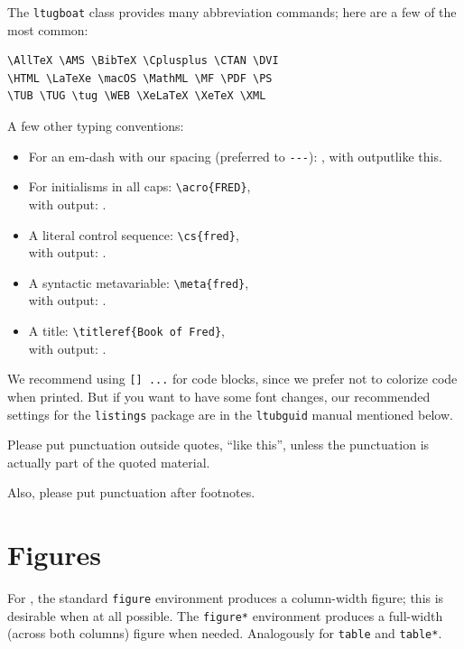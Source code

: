 \documentclass{ltugboat}
\begin{document}
The \texttt{ltugboat} class provides many abbreviation commands; here
are a few of the most common:

\begin{verbatim}
\AllTeX \AMS \BibTeX \Cplusplus \CTAN \DVI
\HTML \LaTeXe \macOS \MathML \MF \PDF \PS
\TUB \TUG \tug \WEB \XeLaTeX \XeTeX \XML
\end{verbatim}

A few other typing conventions:

\begin{itemize}
\item For an em-dash with our spacing (preferred to \verb|---|):
, with output\Dash like this.

\item For initialisms in all caps:
\verb|\acro{FRED}|,\\ with output: .

\item A literal control sequence:
\verb|\cs{fred}|,\\ with output: .

\item A syntactic metavariable:
\verb|\meta{fred}|,\\ with output: .

\item A title:
\verb|\titleref{Book of Fred}|,\\ with output: .
\end{itemize}

We recommend using \texttt{[] ...}
 for code blocks, since we prefer not to
colorize code when printed. But if you want to have some font changes,
our recommended settings for the \texttt{listings} package are in the
\texttt{ltubguid} manual mentioned below.

Please put punctuation outside quotes, ``like this'', unless the
punctuation is actually part of the quoted material.

Also, please put punctuation after footnotes.

\section{Figures}

For \TUB, the standard \texttt{figure} environment produces a
column-width figure; this is desirable when at all possible. The
\texttt{figure*} environment produces a full-width (across both columns)
figure when needed. Analogously for \texttt{table} and \texttt{table*}.
\end{document}
